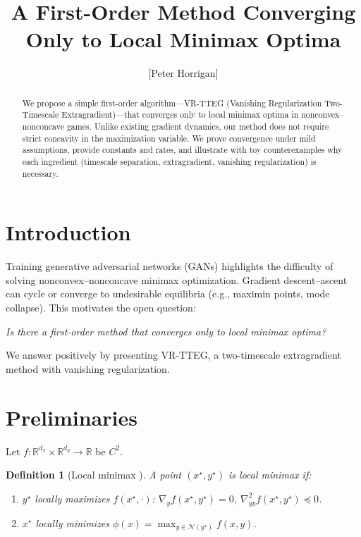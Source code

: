 \documentclass[11pt]{article}
\title{A First-Order Method Converging Only to Local Minimax Optima}
\author{[Peter Horrigan]}
\date{}
\newtheorem{definition}{Definition}
\begin{document}
\maketitle

\begin{abstract}
We propose a simple first-order algorithm---VR-TTEG (Vanishing Regularization Two-Timescale Extragradient)---that converges only to local minimax optima in nonconvex--nonconcave games. Unlike existing gradient dynamics, our method does not require strict concavity in the maximization variable. We prove convergence under mild assumptions, provide constants and rates, and illustrate with toy counterexamples why each ingredient (timescale separation, extragradient, vanishing regularization) is necessary.
\end{abstract}

\section{Introduction}
Training generative adversarial networks (GANs) highlights the difficulty of solving nonconvex--nonconcave minimax optimization. Gradient descent--ascent can cycle or converge to undesirable equilibria (e.g., maximin points, mode collapse). This motivates the open question:

\emph{Is there a first-order method that converges only to local minimax optima?}

We answer positively by presenting VR-TTEG, a two-timescale extragradient method with vanishing regularization.

\section{Preliminaries}
Let $f:\mathbb{R}^{d_x}\times \mathbb{R}^{d_y}\to\mathbb{R}$ be $C^2$. 

\begin{definition}[Local minimax \cite{jin2020}]
A point $(x^\star,y^\star)$ is local minimax if:
\begin{enumerate}
    \item $y^\star$ locally maximizes $f(x^\star,\cdot)$:
    $\nabla_y f(x^\star,y^\star)=0$, $\nabla^2_{yy} f(x^\star,y^\star)\preceq 0$.
    \item $x^\star$ locally minimizes $\phi(x)=\max_{y\in \mathcal{N}(y^\star)} f(x,y)$.
\end{enumerate}
\end{definition}
\end{document}
